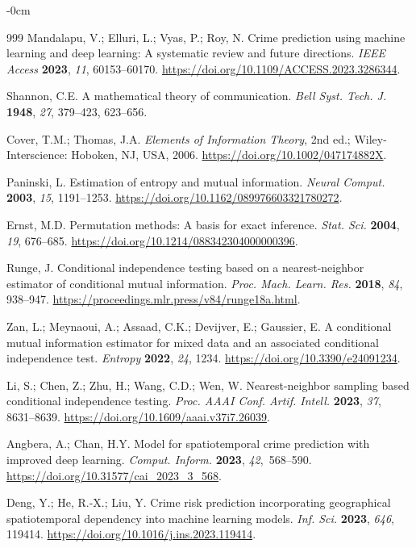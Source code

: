\documentclass[applsci,article,accept,moreauthors]{Definitions/mdpi}
\begin{document}
\begin{adjustwidth}{-\extralength}{0cm}
\begin{thebibliography}{999}
Mandalapu, V.; Elluri, L.; Vyas, P.; Roy, N. Crime prediction using machine learning and deep learning: A systematic review and future directions. \emph{IEEE Access} \textbf{2023}, \emph{11}, 60153--60170. \url{https://doi.org/10.1109/ACCESS.2023.3286344}.

Shannon, C.E. A mathematical theory of communication. \emph{Bell Syst. Tech. J.} \textbf{1948}, \emph{27}, 379--423, 623--656.

Cover, T.M.; Thomas, J.A. \emph{Elements of Information Theory}, 2nd ed.;
Wiley-Interscience: Hoboken, NJ, USA, 2006.
\url{https://doi.org/10.1002/047174882X}.



Paninski, L. Estimation of entropy and mutual information. \emph{Neural Comput.} \textbf{2003}, \emph{15}, 1191--1253. \url{https://doi.org/10.1162/089976603321780272}.

Ernst, M.D. Permutation methods: A basis for exact inference. \emph{Stat. Sci.} \textbf{2004}, \emph{19}, 676--685. \url{https://doi.org/10.1214/088342304000000396}.

Runge, J. Conditional independence testing based on a nearest-neighbor estimator of conditional mutual information. \emph{Proc. Mach. Learn. Res.} \textbf{2018}, \emph{84}, 938--947. \url{https://proceedings.mlr.press/v84/runge18a.html}.

Zan, L.; Meynaoui, A.; Assaad, C.K.; Devijver, E.; Gaussier, E. A conditional mutual information estimator for mixed data and an associated conditional independence test. \emph{Entropy} \textbf{2022}, \emph{24}, 1234. \url{https://doi.org/10.3390/e24091234}.



Li, S.; Chen, Z.; Zhu, H.; Wang, C.D.; Wen, W. Nearest-neighbor sampling based conditional independence testing. \emph{Proc. AAAI Conf. Artif. Intell.} \textbf{2023}, \emph{37}, 8631--8639. \url{https://doi.org/10.1609/aaai.v37i7.26039}.




Angbera, A.; Chan, H.Y. Model for spatiotemporal crime prediction with
improved deep learning. \emph{Comput. Inform.} \textbf{2023}, \emph{42},~568--590. \url{https://doi.org/10.31577/cai_2023_3_568}.



Deng, Y.; He, R.-X.; Liu, Y. Crime risk prediction incorporating geographical spatiotemporal dependency into machine learning models. \emph{Inf. Sci.} \textbf{2023}, \emph{646}, 119414. \url{https://doi.org/10.1016/j.ins.2023.119414}.




\end{thebibliography}
\end{adjustwidth}
\end{document}
